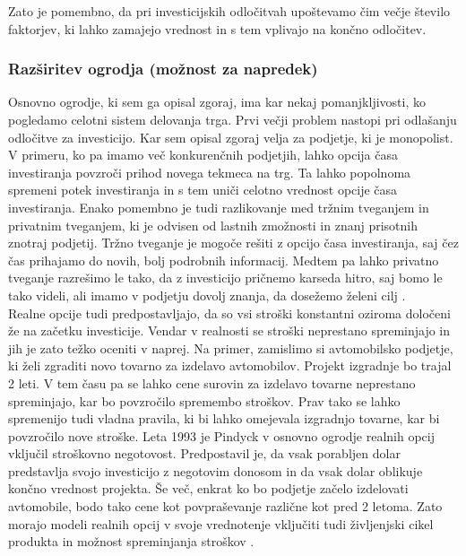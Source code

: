 Zato je pomembno, da pri investicijskih odločitvah upoštevamo čim večje število faktorjev, ki lahko zamajejo vrednost in s tem vplivajo na končno odločitev.   
 
\subsubsection{Razširitev ogrodja (možnost za napredek)}
Osnovno ogrodje, ki sem ga opisal zgoraj, ima kar nekaj pomanjkljivosti, ko pogledamo celotni sistem delovanja trga. Prvi večji problem nastopi pri odlašanju odločitve za investicijo. Kar sem opisal zgoraj velja za podjetje, ki je monopolist. V primeru, ko pa imamo več konkurenčnih podjetjih, lahko opcija časa investiranja povzroči prihod novega tekmeca na trg. Ta lahko popolnoma spremeni potek investiranja in s tem uniči celotno vrednost opcije časa investiranja. Enako pomembno je tudi razlikovanje med tržnim tveganjem in privatnim tveganjem, ki je odvisen od lastnih zmožnosti in znanj prisotnih znotraj podjetij. Tržno tveganje je mogoče rešiti z opcijo časa investiranja, saj čez čas prihajamo do novih, bolj podrobnih informacij. Medtem pa lahko privatno tveganje razrešimo le tako, da z investicijo pričnemo karseda hitro, saj bomo le tako videli, ali imamo v podjetju dovolj znanja, da dosežemo želeni cilj \cite[str. 38, 39]{Brach}. \\

Realne opcije tudi predpostavljajo, da so vsi stroški konstantni oziroma določeni že na začetku investicije. Vendar v realnosti se stroški neprestano spreminjajo in jih je zato težko oceniti v naprej. Na primer, zamislimo si avtomobilsko podjetje, ki želi zgraditi novo tovarno za izdelavo avtomobilov. Projekt izgradnje bo trajal 2 leti. V tem času pa se lahko cene surovin za izdelavo tovarne neprestano spreminjajo, kar bo povzročilo spremembo stroškov. Prav tako se lahko spremenijo tudi vladna pravila, ki bi lahko omejevala izgradnjo tovarne, kar bi povzročilo nove stroške. Leta 1993 je Pindyck v osnovno ogrodje realnih opcij vključil stroškovno negotovost. Predpostavil je, da vsak porabljen dolar predstavlja svojo investicijo z negotovim donosom in da vsak dolar oblikuje končno vrednost projekta. Še več, enkrat ko bo podjetje začelo izdelovati avtomobile, bodo tako cene kot povpraševanje različne kot pred 2 letoma. Zato morajo modeli realnih opcij v svoje vrednotenje vključiti tudi življenjski cikel produkta in možnost spreminjanja stroškov \cite[str. 39-42]{Brach}. \\

